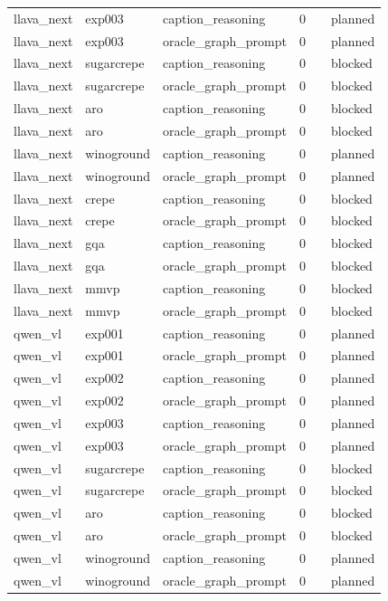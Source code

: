 \begin{table}[t]
\begin{tabular}{llllll}
llava\_next & exp003 & caption\_reasoning & 0 &  & planned \\
llava\_next & exp003 & oracle\_graph\_prompt & 0 &  & planned \\
llava\_next & sugarcrepe & caption\_reasoning & 0 &  & blocked \\
llava\_next & sugarcrepe & oracle\_graph\_prompt & 0 &  & blocked \\
llava\_next & aro & caption\_reasoning & 0 &  & blocked \\
llava\_next & aro & oracle\_graph\_prompt & 0 &  & blocked \\
llava\_next & winoground & caption\_reasoning & 0 &  & planned \\
llava\_next & winoground & oracle\_graph\_prompt & 0 &  & planned \\
llava\_next & crepe & caption\_reasoning & 0 &  & blocked \\
llava\_next & crepe & oracle\_graph\_prompt & 0 &  & blocked \\
llava\_next & gqa & caption\_reasoning & 0 &  & blocked \\
llava\_next & gqa & oracle\_graph\_prompt & 0 &  & blocked \\
llava\_next & mmvp & caption\_reasoning & 0 &  & blocked \\
llava\_next & mmvp & oracle\_graph\_prompt & 0 &  & blocked \\
qwen\_vl & exp001 & caption\_reasoning & 0 &  & planned \\
qwen\_vl & exp001 & oracle\_graph\_prompt & 0 &  & planned \\
qwen\_vl & exp002 & caption\_reasoning & 0 &  & planned \\
qwen\_vl & exp002 & oracle\_graph\_prompt & 0 &  & planned \\
qwen\_vl & exp003 & caption\_reasoning & 0 &  & planned \\
qwen\_vl & exp003 & oracle\_graph\_prompt & 0 &  & planned \\
qwen\_vl & sugarcrepe & caption\_reasoning & 0 &  & blocked \\
qwen\_vl & sugarcrepe & oracle\_graph\_prompt & 0 &  & blocked \\
qwen\_vl & aro & caption\_reasoning & 0 &  & blocked \\
qwen\_vl & aro & oracle\_graph\_prompt & 0 &  & blocked \\
qwen\_vl & winoground & caption\_reasoning & 0 &  & planned \\
qwen\_vl & winoground & oracle\_graph\_prompt & 0 &  & planned \\

\end{tabular}
\end{table}
